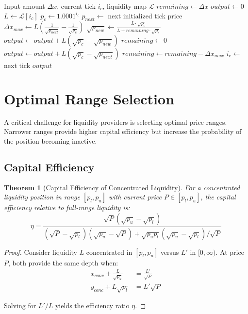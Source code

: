 \documentclass[11pt,a4paper]{article}
\newtheorem{theorem}{Theorem}
\begin{document}
\begin{algorithm}
\caption{Lux AMM Swap Execution}
\begin{algorithmic}[1]
\Require Input amount $\Delta x$, current tick $i_c$, liquidity map $\mathcal{L}$
\State $remaining \gets \Delta x$
\State $output \gets 0$
    \State $L \gets \mathcal{L}[i_c]$ 
    \State $p_c \gets 1.0001^{i_c}$
    \State $p_{next} \gets$ next initialized tick price
    \State $\Delta x_{max} \gets L(\frac{1}{\sqrt{p_{next}}} - \frac{1}{\sqrt{p_c}})$
        \State $\sqrt{p_{new}} \gets \frac{L \cdot \sqrt{p_c}}{L + remaining \cdot \sqrt{p_c}}$
        \State $output \gets output + L(\sqrt{p_c} - \sqrt{p_{new}})$
        \State $remaining \gets 0$
    \Else
        \State $output \gets output + L(\sqrt{p_c} - \sqrt{p_{next}})$
        \State $remaining \gets remaining - \Delta x_{max}$
        \State $i_c \gets$ next tick
    \EndIf
\EndWhile
\State \Return $output$
\end{algorithmic}
\end{algorithm}

\section{Optimal Range Selection}

A critical challenge for liquidity providers is selecting optimal price ranges. Narrower ranges provide higher capital efficiency but increase the probability of the position becoming inactive.

\subsection{Capital Efficiency}

\begin{theorem}[Capital Efficiency of Concentrated Liquidity]
For a concentrated liquidity position in range $[p_l, p_u]$ with current price $P \in [p_l, p_u]$, the capital efficiency relative to full-range liquidity is:
\begin{equation}
    \eta = \frac{\sqrt{P}(\sqrt{p_u} - \sqrt{p_l})}{(\sqrt{P} - \sqrt{p_l})(\sqrt{p_u} - \sqrt{P}) + \sqrt{p_u p_l}(\sqrt{p_u} - \sqrt{p_l})/\sqrt{P}}
\end{equation}
\end{theorem}

\begin{proof}
Consider liquidity $L$ concentrated in $[p_l, p_u]$ versus $L'$ in $[0, \infty)$. At price $P$, both provide the same depth when:
\begin{align}
    x_{conc} + \frac{L}{\sqrt{p_u}} &= \frac{L'}{\sqrt{P}} \\
    y_{conc} + L\sqrt{p_l} &= L'\sqrt{P}
\end{align}

Solving for $L'/L$ yields the efficiency ratio $\eta$.
\end{proof}
\end{document}
